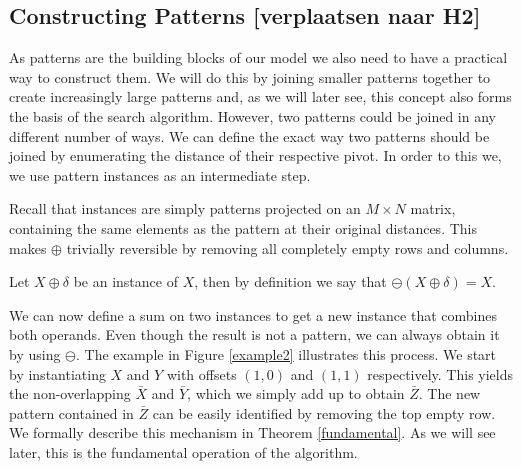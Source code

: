 \documentclass{llncs}
\begin{document}
\subsection{Constructing Patterns [verplaatsen naar H2]}

As patterns are the building blocks of our model we also need to have a practical way to construct them. We will do this by joining smaller patterns together to create increasingly large patterns and, as we will later see, this concept also forms the basis of the search algorithm. However, two patterns could be joined in any different number of ways. We can define the exact way two patterns should be joined by enumerating the distance of their respective pivot. In order to this we, we use pattern instances as an intermediate step.

Recall that instances are simply patterns projected on an $M\times N$ matrix, containing the same elements as the pattern at their original distances. This makes $\oplus$ trivially reversible by removing all completely empty rows and columns.

\begin{definition}
Let $X \oplus \delta$ be an instance of $X$, then by definition we say that $\ominus(X \oplus \delta) = X$.
\end{definition}

We can now define a sum on two instances to get a new instance that combines both operands. Even though the result is not a pattern, we can always obtain it by using $\ominus$. The example in Figure \ref{example2} illustrates this process. We start by instantiating $X$ and $Y$ with offsets $(1,0)$ and $(1,1)$ respectively. This yields the non-overlapping $\bar{X}$ and $\bar{Y}$, which we simply add up to obtain $\bar{Z}$. The new pattern contained in $\bar{Z}$ can be easily identified by removing the top empty row. We formally describe this mechanism in Theorem \ref{fundamental}. As we will see later, this is the fundamental operation of the algorithm.
\end{document}
